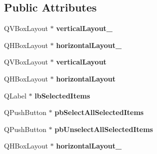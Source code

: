 \subsection*{Public Attributes}
\begin{DoxyCompactItemize}
\item 
\hypertarget{class_ui__mdt_items_selector_dialog_a76cf24374f7a665361be0b32e97b9e03}{
QVBoxLayout $\ast$ {\bfseries verticalLayout\_}}
\label{class_ui__mdt_items_selector_dialog_a76cf24374f7a665361be0b32e97b9e03}

\item 
\hypertarget{class_ui__mdt_items_selector_dialog_a0337a8fd075328bbee2ce55fffd4f5b9}{
QHBoxLayout $\ast$ {\bfseries horizontalLayout\_}}
\label{class_ui__mdt_items_selector_dialog_a0337a8fd075328bbee2ce55fffd4f5b9}

\item 
\hypertarget{class_ui__mdt_items_selector_dialog_a11c12aaac1f31c83dcb4d3538a9f2e43}{
QVBoxLayout $\ast$ {\bfseries verticalLayout}}
\label{class_ui__mdt_items_selector_dialog_a11c12aaac1f31c83dcb4d3538a9f2e43}

\item 
\hypertarget{class_ui__mdt_items_selector_dialog_a5c056b0287e33b9e1bcd1c80d522fc2c}{
QHBoxLayout $\ast$ {\bfseries horizontalLayout}}
\label{class_ui__mdt_items_selector_dialog_a5c056b0287e33b9e1bcd1c80d522fc2c}

\item 
\hypertarget{class_ui__mdt_items_selector_dialog_a4d76bc016714c9a3c987e1d3e180a70b}{
QLabel $\ast$ {\bfseries lbSelectedItems}}
\label{class_ui__mdt_items_selector_dialog_a4d76bc016714c9a3c987e1d3e180a70b}

\item 
\hypertarget{class_ui__mdt_items_selector_dialog_a680134293d78490bd18e38774f1068d6}{
QPushButton $\ast$ {\bfseries pbSelectAllSelectedItems}}
\label{class_ui__mdt_items_selector_dialog_a680134293d78490bd18e38774f1068d6}

\item 
\hypertarget{class_ui__mdt_items_selector_dialog_abc7b9edc742879adc682649d76ea7395}{
QPushButton $\ast$ {\bfseries pbUnselectAllSelectedItems}}
\label{class_ui__mdt_items_selector_dialog_abc7b9edc742879adc682649d76ea7395}

\item 
\hypertarget{class_ui__mdt_items_selector_dialog_a400e7149ace7fc0dfb52e85b85072ebc}{
QHBoxLayout $\ast$ {\bfseries horizontalLayout\_}}
\label{class_ui__mdt_items_selector_dialog_a400e7149ace7fc0dfb52e85b85072ebc}


\end{DoxyCompactItemize}
